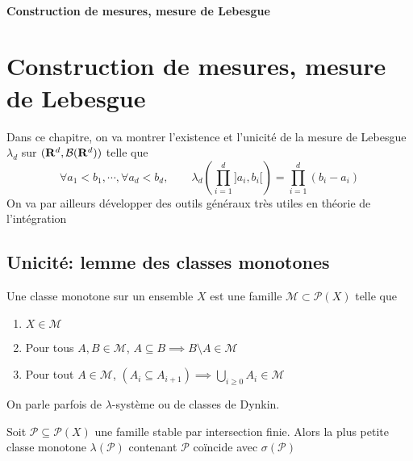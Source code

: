\ifsolo
    ~

    \vspace{1cm}

    \begin{center}
        \textbf{\LARGE Construction de mesures, mesure de Lebesgue} \\[1em]
    \end{center}
    \tableofcontents
\else
    \chapter{Construction de mesures, mesure de Lebesgue}

    \minitoc
\fi
\thispagestyle{empty}

Dans ce chapitre, on va montrer l'existence et l'unicité de la mesure de Lebesgue $\lambda_d$ sur  $(\mathbf R^d, \mathcal  B(\mathbf R^d))$ telle que \[
    \forall  a_1<b_1, \cdots , \forall  a_d<b_d, \qquad  \lambda_d \left( \prod_{i=1}^d ]a_i, b_i[ \right)= \prod_{i=1}^{d} (b_i-a_i) 
\]
On va par ailleurs développer des outils généraux très utiles en théorie de l'intégration

\section{Unicité: lemme des classes monotones}

\begin{dfn}
    Une classe monotone sur un ensemble $X$ est une famille  $\mathcal  M\subset \mathcal  P(X)$ telle que \begin{enumerate}
        \item $X \in  \mathcal  M$
        \item Pour tous $A, B \in  \mathcal  M$, $A\subseteq B \implies B \setminus A \in  \mathcal  M$
        \item Pour tout  $A \in  \mathcal  M$, $(A_i\subseteq A_{i+1})\implies \bigcup_{i\geq 0}A_i \in  \mathcal  M$
    \end{enumerate}
    On parle parfois de $\lambda$-système ou de classes de Dynkin.
\end{dfn}

\begin{lmm}
     Soit $\mathcal  P\subseteq \mathcal  P(X)$ une famille stable par intersection finie\footnotemark. Alors la plus petite classe monotone $\lambda(\mathcal  P)$ contenant $\mathcal  P$ coïncide avec $\sigma(\mathcal  P)$
\end{lmm}

